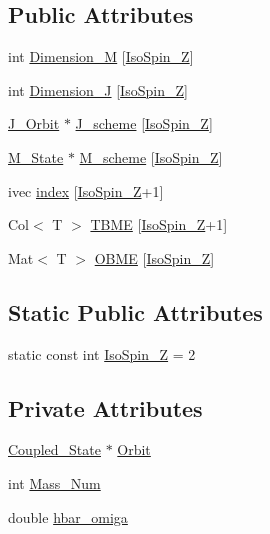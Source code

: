 \subsection*{Public Attributes}
\begin{DoxyCompactItemize}
\item 
int \hyperlink{class_interaction_afef136dd95339bef3a8c5e8488f6455f}{Dimension\-\_\-\-M} \mbox{[}\hyperlink{class_interaction_a067c62aec0e8fba647d5e5cefb13fadc}{Iso\-Spin\-\_\-\-Z}\mbox{]}
\item 
int \hyperlink{class_interaction_ae169b32f8b692bdf54bdae97c2f395be}{Dimension\-\_\-\-J} \mbox{[}\hyperlink{class_interaction_a067c62aec0e8fba647d5e5cefb13fadc}{Iso\-Spin\-\_\-\-Z}\mbox{]}
\item 
\hyperlink{class_j___orbit}{J\-\_\-\-Orbit} $\ast$ \hyperlink{class_interaction_a42d5c1378bd17f7755424f7ab5702ef6}{J\-\_\-scheme} \mbox{[}\hyperlink{class_interaction_a067c62aec0e8fba647d5e5cefb13fadc}{Iso\-Spin\-\_\-\-Z}\mbox{]}
\item 
\hyperlink{class_m___state}{M\-\_\-\-State} $\ast$ \hyperlink{class_interaction_ad29cbf9eca392e71958932cef5f7bf66}{M\-\_\-scheme} \mbox{[}\hyperlink{class_interaction_a067c62aec0e8fba647d5e5cefb13fadc}{Iso\-Spin\-\_\-\-Z}\mbox{]}
\item 
ivec \hyperlink{class_interaction_acfc6941cb6a85c4368855da6503a892f}{index} \mbox{[}\hyperlink{class_interaction_a067c62aec0e8fba647d5e5cefb13fadc}{Iso\-Spin\-\_\-\-Z}+1\mbox{]}
\item 
Col$<$ T $>$ \hyperlink{class_interaction_ac7b745819fe9b13f3df3bd7750eceb97}{T\-B\-M\-E} \mbox{[}\hyperlink{class_interaction_a067c62aec0e8fba647d5e5cefb13fadc}{Iso\-Spin\-\_\-\-Z}+1\mbox{]}
\item 
Mat$<$ T $>$ \hyperlink{class_interaction_ad629df71841bfb02116616b2f4764811}{O\-B\-M\-E} \mbox{[}\hyperlink{class_interaction_a067c62aec0e8fba647d5e5cefb13fadc}{Iso\-Spin\-\_\-\-Z}\mbox{]}
\end{DoxyCompactItemize}
\subsection*{Static Public Attributes}
\begin{DoxyCompactItemize}
\item 
static const int \hyperlink{class_interaction_a067c62aec0e8fba647d5e5cefb13fadc}{Iso\-Spin\-\_\-\-Z} = 2
\end{DoxyCompactItemize}
\subsection*{Private Attributes}
\begin{DoxyCompactItemize}
\item 
\hyperlink{struct_coupled___state}{Coupled\-\_\-\-State} $\ast$ \hyperlink{class_interaction_aafd4ee901de0d1463b71f89294b4b3f5}{Orbit}
\item 
int \hyperlink{class_interaction_a5a8eceab2bed942ec46d581b4cd4a661}{Mass\-\_\-\-Num}
\item 
double \hyperlink{class_interaction_afd1f26a552c012f6444e02a0f2718388}{hbar\-\_\-omiga}
\end{DoxyCompactItemize}


